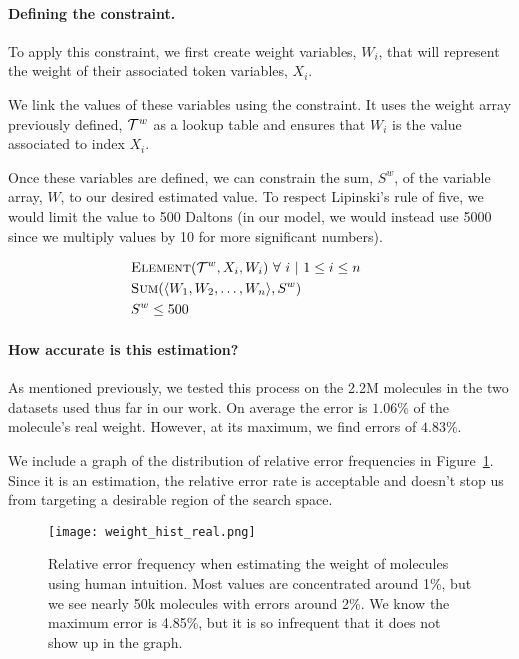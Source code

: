 \documentclass[../Document.tex]{subfiles}
\begin{document}
\paragraph{Defining the constraint.}
To apply this constraint, we first create weight variables, $W_i$, that will represent the weight of their associated token variables, $X_i$.

We link the values of these variables using the \element constraint. It uses the weight array previously defined, ${\cal T}^w$ as a lookup table and ensures that $W_i$ is the value associated to index $X_i$.

Once these variables are defined, we can constrain the sum, $S^w$, of the variable array, $W$, to our desired estimated value. To respect Lipinski's rule of five, we would limit the value to 500 Daltons (in our model, we would instead use 5000 since we multiply values by 10 for more significant numbers).


\begin{align*}
    &\mbox{\sc Element}({\cal T}^w, X_i, W_i)\ \forall\ i\ \vert\ 1 \leq i \leq n \\
    &\mbox{\sc Sum}(\langle W_1, W_2,\ldots,W_n \rangle, S^w) & & \\
    &S^w \leq 500  & &
\end{align*}

\paragraph{How accurate is this estimation?}
As mentioned previously, we tested this process on the 2.2M molecules in the two datasets used thus far in our work. On average the error is $1.06\%$ of the molecule's real weight. However, at its maximum, we find errors of $4.83\%$.

We include a graph of the distribution of relative error frequencies in Figure~\ref{fig:initial-weight-estimation}. Since it is an estimation, the relative error rate is acceptable and doesn't stop us from targeting a desirable region of the search space.

\begin{figure}[ht]
    \centering
    \texttt{[image: weight\_hist\_real.png]}
    \caption[Relative error frequency when estimating the weight of molecules using human intuition]{Relative error frequency when estimating the weight of molecules using human intuition. Most values are concentrated around 1\%, but we see nearly 50k molecules with errors around 2\%. We know the maximum error is 4.85\%, but it is so infrequent that it does not show up in the graph.}
    \label{fig:initial-weight-estimation}
\end{figure}
\end{document}
